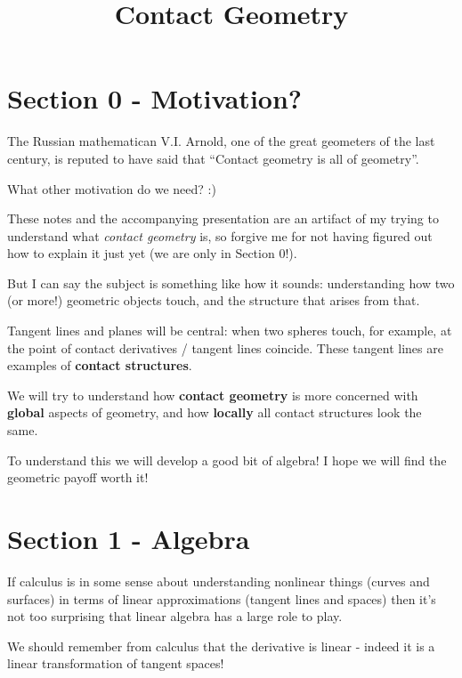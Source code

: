 \documentclass{article}
\begin{document}
\title {Contact Geometry}
\maketitle

\vspace{.5pc}
\vspace{2pc}

\section* {Section 0 - Motivation?}

The Russian mathematican V.I. Arnold, one of the great geometers of the last
century, is reputed to have said that ``Contact geometry is all of geometry''.

What other motivation do we need? :)

These notes and the accompanying presentation are an artifact of my trying to
understand what \textsl{contact geometry} is, so forgive me for not having
figured out how to explain it just yet (we are only in Section 0!).

But I can say the subject is something like how it sounds: understanding how two
(or more!) geometric objects touch, and the structure that arises from that.

Tangent lines and planes will be central: when two spheres touch, for example,
at the point of contact derivatives / tangent lines coincide. These tangent
lines are examples of \textbf{contact structures}.

We will try to understand how \textbf{contact geometry} is more concerned with
\textbf{global} aspects of geometry, and how \textbf{locally} all contact
structures look the same.

To understand this we will develop a good bit of algebra! I hope we will find
the geometric payoff worth it!

\section* {Section 1 - Algebra}
If calculus is in some sense about understanding nonlinear things (curves and
surfaces) in terms of linear approximations (tangent lines and spaces) then it's
not too surprising that linear algebra has a large role to play.

We should remember from calculus that the derivative is linear - indeed it is a
linear transformation of tangent spaces!
\end{document}
